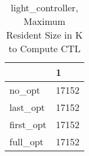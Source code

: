 \begin{table}
\caption{light\_controller, Maximum Resident Size in K to Compute CTL}
\label{light_controller_CTL_size}
\begin{tabular}{ll}
\toprule
 & 1 \\
\midrule
no\_opt & 17152 \\
last\_opt & 17152 \\
first\_opt & 17152 \\
full\_opt & 17152 \\
\bottomrule
\end{tabular}
\end{table}
